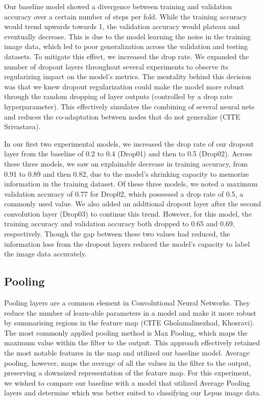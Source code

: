 \documentclass{article}
\begin{document}
Our baseline model showed a divergence between training and validation accuracy over a certain number of steps per fold. While the training accuracy would trend upwards towards 1, the validation accuracy would plateau and eventually decrease. This is due to the model learning the noise in the training image data, which led to poor generalization across the validation and testing datasets. To mitigate this effect, we increased the drop rate. We expanded the number of dropout layers throughout several experiments to observe its regularizing impact on the model’s metrics. The mentality behind this decision was that we knew dropout regularization could make the model more robust through the random dropping of layer outputs (controlled by a drop rate hyperparameter). This effectively simulates the combining of several neural nets and reduces the co-adaptation between nodes that do not generalize (CITE Srivastava). 

In our first two experimental models, we increased the drop rate of our dropout layer from the baseline of 0.2 to 0.4 (Drop01) and then to 0.5 (Drop02). Across these three models, we saw an explainable decrease in training accuracy, from 0.91 to 0.89 and then 0.82, due to the model’s shrinking capacity to memorize information in the training dataset. Of these three models, we noted a maximum validation accuracy of 0.77 for Drop02, which possessed a drop rate of 0.5, a commonly used value. We also added an additional dropout layer after the second convolution layer (Drop03) to continue this trend. However, for this model, the training accuracy and validation accuracy both dropped to 0.65 and 0.69, respectively. Though the gap between these two values had reduced, the information loss from the dropout layers reduced the model’s capacity to label the image data accurately.


\subsection{Pooling}

Pooling layers are a common element in Convolutional Neural Networks. They reduce the number of learn-able parameters in a model and make it more robust by summarising regions in the feature map (CITE Gholamalinezhad, Khosravi). The most commonly applied pooling method is Max Pooling, which maps the maximum value within the filter to the output. This approach effectively retained the most notable features in the map and utilized our baseline model. Average pooling, however, maps the average of all the values in the filter to the output, preserving a downsized representation of the feature map. For this experiment, we wished to compare our baseline with a model that utilized Average Pooling layers and determine which was better suited to classifying our Lepus image data.
\end{document}
